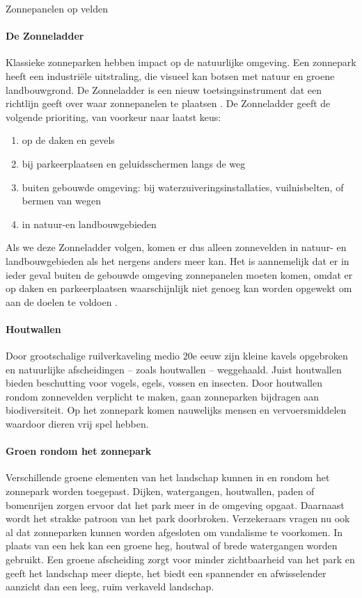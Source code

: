 \begin{voorstel}{Zonnepanelen op velden}
\begin{multicols}{2}
\begin{overwegingen}
\paragraph{De Zonneladder}
Klassieke zonneparken hebben impact op de natuurlijke omgeving. Een zonnepark heeft een industriële uitstraling, die visueel kan botsen met natuur en groene landbouwgrond. De Zonneladder is een nieuw toetsingsinstrument dat een richtlijn geeft over waar zonnepanelen te plaatsen \parencite{dik-faber_motie_2018, sluiter_zonneladder_2019}.
De Zonneladder geeft de volgende prioriting, van voorkeur naar laatst keus:
\begin{enumerate}
	\item op de daken en gevels
	\item bij parkeerplaatsen en geluidsschermen langs de weg
	\item buiten gebouwde omgeving: bij waterzuiveringsinstallaties, vuilnisbelten, of bermen van wegen
	\item in natuur-en landbouwgebieden
\end{enumerate}
Als we deze Zonneladder volgen, komen er dus alleen zonnevelden in natuur- en landbouwgebieden als het nergens anders meer kan.
Het is aannemelijk dat er in ieder geval buiten de gebouwde omgeving zonnepanelen moeten komen, omdat er op daken en parkeerplaatsen waarschijnlijk niet genoeg kan worden opgewekt om aan de doelen te voldoen \parencite{spruijt_wat_2015}.

\paragraph{Houtwallen}
Door grootschalige ruilverkaveling medio 20e eeuw zijn kleine kavels opgebroken en natuurlijke afscheidingen – zoals houtwallen – weggehaald. Juist houtwallen bieden beschutting voor vogels, egels, vossen en insecten. Door houtwallen rondom zonnevelden verplicht te maken, gaan zonneparken bijdragen aan biodiversiteit. Op het zonnepark komen nauwelijks mensen en vervoersmiddelen waardoor dieren vrij spel hebben.

\paragraph{Groen rondom het zonnepark}
Verschillende groene elementen van het landschap kunnen in en rondom het zonnepark worden toegepast. Dijken, watergangen, houtwallen, paden of bomenrijen zorgen ervoor dat het park meer in de omgeving opgaat. Daarnaast wordt het strakke patroon van het park doorbroken. Verzekeraars vragen nu ook al dat zonneparken kunnen worden afgesloten om vandalisme te voorkomen. In plaats van een hek kan een groene heg, houtwal of brede watergangen worden gebruikt. Een groene afscheiding zorgt voor minder zichtbaarheid van het park en geeft het landschap meer diepte, het biedt een spannender en afwisselender aanzicht dan een leeg, ruim verkaveld landschap.


\end{overwegingen}
\end{multicols}
\end{voorstel}
